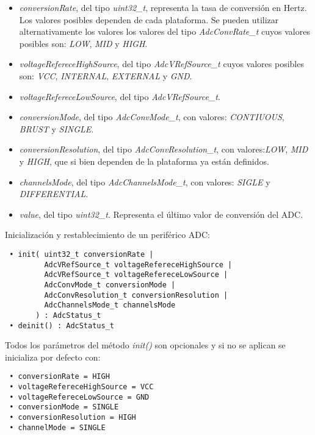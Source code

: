 \begin{itemize}
\item
\emph{conversionRate}, del tipo \emph{uint32\_t}, representa la tasa de conversión en Hertz. Los valores posibles dependen de cada plataforma. Se pueden utilizar alternativamente los valores los valores del tipo \emph{AdcConvRate\_t} cuyos valores posibles son: \emph{LOW}, \emph{MID} y \emph{HIGH}.
\item
\emph{voltageRefereceHighSource}, del tipo \emph{AdcVRefSource\_t} cuyos valores posibles son: \emph{VCC}, \emph{INTERNAL}, \emph{EXTERNAL} y \emph{GND}.
\item
\emph{voltageRefereceLowSource}, del tipo \emph{AdcVRefSource\_t}.
\item
\emph{conversionMode}, del tipo \emph{AdcConvMode\_t}, con valores: \emph{CONTIUOUS}, \emph{BRUST} y \emph{SINGLE}.
\item
\emph{conversionResolution}, del tipo \emph{AdcConvResolution\_t}, con valores:\emph{LOW}, \emph{MID} y \emph{HIGH}, que si bien dependen de la plataforma ya están definidos.
\item
\emph{channelsMode}, del tipo \emph{AdcChannelsMode\_t}, con valores: \emph{SIGLE} y \emph{DIFFERENTIAL}.
\item
\emph{value}, del tipo \emph{uint32\_t}. Representa el último valor de conversión del ADC.
\end{itemize}


Inicialización y restablecimiento de un periférico ADC:

\begin{verbatim}
 • init( uint32_t conversionRate | 
         AdcVRefSource_t voltageRefereceHighSource |
         AdcVRefSource_t voltageRefereceLowSource |
         AdcConvMode_t conversionMode |
         AdcConvResolution_t conversionResolution |
         AdcChannelsMode_t channelsMode
       ) : AdcStatus_t
 • deinit() : AdcStatus_t
\end{verbatim}

Todos los parámetros del método \emph{init()} son opcionales y si no se aplican se inicializa por defecto con:

\begin{verbatim}
 • conversionRate = HIGH
 • voltageRefereceHighSource = VCC
 • voltageRefereceLowSource = GND
 • conversionMode = SINGLE
 • conversionResolution = HIGH
 • channelMode = SINGLE
\end{verbatim}

